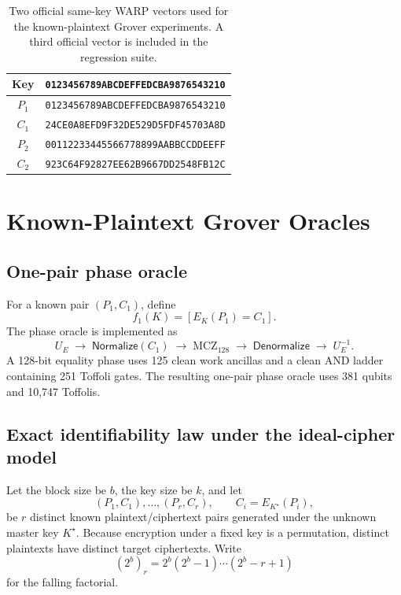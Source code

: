 \documentclass[pdflatex,sn-nature]{sn-jnl}
\theoremstyle{thmstyleone}
\theoremstyle{thmstyletwo}
\begin{document}
\begin{table}[t]
\centering
\caption{Two official same-key WARP vectors used for the known-plaintext Grover experiments. A third official vector is included in the regression suite.}
\label{tab:vectors}
\small
\begin{tabular}{c@{\;}l}
\toprule
Key & \texttt{0123456789ABCDEFFEDCBA9876543210}\\
\midrule
$P_1$ & \texttt{0123456789ABCDEFFEDCBA9876543210}\\
$C_1$ & \texttt{24CE0A8EFD9F32DE529D5FDF45703A8D}\\
\addlinespace
$P_2$ & \texttt{00112233445566778899AABBCCDDEEFF}\\
$C_2$ & \texttt{923C64F92827EE62B9667DD2548FB12C}\\
\bottomrule
\end{tabular}
\end{table}
\FloatBarrier

\section{Known-Plaintext Grover Oracles}

\subsection{One-pair phase oracle}
For a known pair $(P_1,C_1)$, define
\begin{equation}
    f_1(K)=[E_K(P_1)=C_1].
\end{equation}
The phase oracle is implemented as
\begin{equation}
U_E\;\rightarrow\;\textsf{Normalize}(C_1)\;\rightarrow\;\mathrm{MCZ}_{128}\;\rightarrow\;\textsf{Denormalize}\;\rightarrow\;U_E^{-1}.
\end{equation}
A 128-bit equality phase uses 125 clean work ancillas and a clean AND ladder containing 251 Toffoli gates. The resulting one-pair phase oracle uses 381 qubits and 10,747 Toffolis.
\subsection{Exact identifiability law under the ideal-cipher model}
\label{subsec:identifiability}
Let the block size be $b$, the key size be $k$, and let
\[
(P_1,C_1),\ldots,(P_r,C_r),\qquad C_i=E_{K^\star}(P_i),
\]
be $r$ distinct known plaintext/ciphertext pairs generated under the unknown master key $K^\star$.  Because encryption under a fixed key is a permutation, distinct plaintexts have distinct target ciphertexts.  Write
\begin{equation}
    (2^b)_r=2^b(2^b-1)\cdots(2^b-r+1)
\end{equation}
for the falling factorial.
\end{document}
